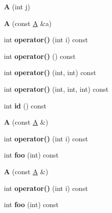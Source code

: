 \begin{DoxyCompactItemize}
{\bfseries A} (int j)
\item 
\mbox{\label{struct_a_a5fe2ed5fdc0b213ea758eeb9c12d5a96}} 
{\bfseries A} (const \mbox{\hyperlink{struct_a}{A}} \&a)
\item 
\mbox{\label{struct_a_a8aead0bb8662ee24644b38711ab6ce2a}} 
int {\bfseries operator()} (int i) const
\item 
\mbox{\label{struct_a_a4eef3f0501e5b172ed6d848b5e80415d}} 
int {\bfseries operator()} () const
\item 
\mbox{\label{struct_a_ac95c3c908e8a14bc1f60332a2445b8ea}} 
int {\bfseries operator()} (int, int) const
\item 
\mbox{\label{struct_a_a80c75bce2cf097ae24e2cfc12ad5bf70}} 
int {\bfseries operator()} (int, int, int) const
\item 
\mbox{\label{struct_a_a53d2b6419261c4920fc6ec4544dfccca}} 
int {\bfseries id} () const
\item 
\mbox{\label{struct_a_aa0f98784263c664c8e73441c1ec951b8}} 
{\bfseries A} (const \mbox{\hyperlink{struct_a}{A}} \&)
\item 
\mbox{\label{struct_a_a8aead0bb8662ee24644b38711ab6ce2a}} 
int {\bfseries operator()} (int i) const
\item 
\mbox{\label{struct_a_ad351da0abcda759fa5d4b5ce78807389}} 
int {\bfseries foo} (int) const
\item 
\mbox{\label{struct_a_aa0f98784263c664c8e73441c1ec951b8}} 
{\bfseries A} (const \mbox{\hyperlink{struct_a}{A}} \&)
\item 
\mbox{\label{struct_a_a8aead0bb8662ee24644b38711ab6ce2a}} 
int {\bfseries operator()} (int i) const
\item 
\mbox{\label{struct_a_ad351da0abcda759fa5d4b5ce78807389}} 
int {\bfseries foo} (int) const
\item 
\mbox{\label{struct_a_a7993d0a2af1ba7cfb23a78e51a4da167}} 

\end{DoxyCompactItemize}
